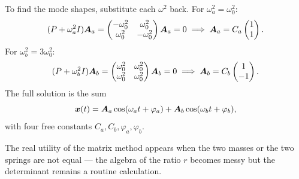 To find the mode shapes, substitute each $\omega^2$ back. For $\omega_a^2 = \omega_0^2$:
\begin{equation}
    (P + \omega_a^2 I) \vect{A}_a =
    \begin{pmatrix} -\omega_0^2 & \omega_0^2 \\ \omega_0^2 & -\omega_0^2 \end{pmatrix} \vect{A}_a = 0
    \;\Longrightarrow\; \vect{A}_a = C_a \begin{pmatrix} 1 \\ 1 \end{pmatrix}.
\end{equation}
For $\omega_b^2 = 3\omega_0^2$:
\begin{equation}
    (P + \omega_b^2 I) \vect{A}_b =
    \begin{pmatrix} \omega_0^2 & \omega_0^2 \\ \omega_0^2 & \omega_0^2 \end{pmatrix} \vect{A}_b = 0
    \;\Longrightarrow\; \vect{A}_b = C_b \begin{pmatrix} 1 \\ -1 \end{pmatrix}.
\end{equation}
The full solution is the sum
\begin{equation}
    \lvect{x}(t) = \vect{A}_a \cos(\omega_a t + \varphi_a) + \vect{A}_b \cos(\omega_b t + \varphi_b),
\end{equation}
with four free constants $C_a, C_b, \varphi_a, \varphi_b$.

The real utility of the matrix method appears when the two masses or the two springs are not equal --- the algebra of the ratio $r$ becomes messy but the determinant remains a routine calculation.

